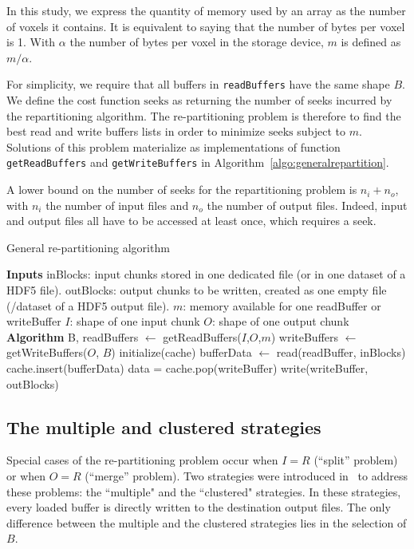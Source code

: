\documentclass[conference]{IEEEtran}
\begin{document}
In this study, we express the quantity of memory used by an array as the
number of voxels it contains. It is equivalent to saying that the number of
bytes per voxel is 1. With $\alpha$ the number of bytes per voxel in the storage
device, $m$ is defined as $m/\alpha$.

For simplicity, we require that all buffers in \texttt{readBuffers} have
the same shape $B$. We define the cost function $\mathrm{seeks}$ as returning
the number of seeks incurred by the repartitioning algorithm.
The re-partitioning problem is therefore to find the best read and write buffers
lists in order to minimize $\mathrm{seeks}$ subject to $m$.
Solutions of this problem materialize as implementations of function
\texttt{getReadBuffers} and \texttt{getWriteBuffers} in
Algorithm~\ref{algo:generalrepartition}.

A lower bound on the number of seeks for the repartitioning problem is
$n_i + n_o$, with $n_i$ the number of input files and $n_o$ the number of output
files. Indeed, input and output files all have to be accessed at least once,
which requires a seek.

\begin{algorithm}
  \caption{General re-partitioning algorithm}
  \label{algo:generalrepartition}
  \begin{algorithmic}[1]
    \STATE \textbf{Inputs}
    \STATE inBlocks: input chunks stored in one dedicated file (or in one dataset of a HDF5 file).
    \STATE outBlocks: output chunks to be written, created as one empty file (/dataset of a HDF5 output file).
    \STATE $m$: memory available for one readBuffer or writeBuffer
    \STATE $I$: shape of one input chunk
    \STATE $O$: shape of one output chunk
    \STATE
    \STATE \textbf{Algorithm}
    \STATE B, readBuffers $\leftarrow$ getReadBuffers($I$,$O$,$m$)
    \STATE writeBuffers $\leftarrow$ getWriteBuffers($O$, $B$)
    \STATE initialize(cache)
      \STATE bufferData $\leftarrow$ read(readBuffer, inBlocks)
      \STATE cache.insert(bufferData)
          \STATE data = cache.pop(writeBuffer)
          \STATE write(writeBuffer, outBlocks)
        \ENDIF
      \ENDFOR
    \ENDFOR

  \end{algorithmic}
\end{algorithm}

\subsection{The multiple and clustered strategies}
Special cases of the re-partitioning problem occur when $I=R$ (``split'' problem)
or when $O=R$ (``merge'' problem). Two strategies were introduced
in~\cite{seqalgorithms} to address these problems: the ``multiple" and the
``clustered" strategies. In these strategies, every loaded buffer is directly written to the
destination output files.
The only difference between the multiple and the clustered strategies lies in
the selection of $B$.
\end{document}
